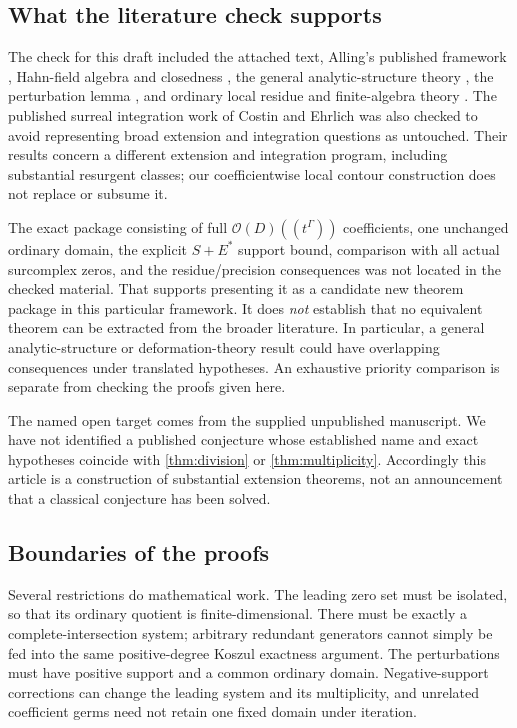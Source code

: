 \documentclass[11pt,letterpaper]{article}
\theoremstyle{definition}
\theoremstyle{remark}
\newcommand{\OO}{\mathcal O}
\numberwithin{equation}{section}
\begin{document}
\subsection{What the literature check supports}
The check for this draft included the attached text, Alling's published framework \cite{Alling}, Hahn-field algebra and closedness \cite{Neumann,Poonen}, the general analytic-structure theory \cite{CluckersLipshitz}, the perturbation lemma \cite{Crainic}, and ordinary local residue and finite-algebra theory \cite{Demailly,Kunz,CattaniDickenstein}. The published surreal integration work of Costin and Ehrlich \cite{CostinEhrlich} was also checked to avoid representing broad extension and integration questions as untouched. Their results concern a different extension and integration program, including substantial resurgent classes; our coefficientwise local contour construction does not replace or subsume it.

The exact package consisting of full $\OO(D)((t^\Gamma))$ coefficients, one unchanged ordinary domain, the explicit $S+E^*$ support bound, comparison with all actual surcomplex zeros, and the residue/precision consequences was not located in the checked material. That supports presenting it as a candidate new theorem package in this particular framework. It does \emph{not} establish that no equivalent theorem can be extracted from the broader literature. In particular, a general analytic-structure or deformation-theory result could have overlapping consequences under translated hypotheses. An exhaustive priority comparison is separate from checking the proofs given here.

The named open target comes from the supplied unpublished manuscript. We have not identified a published conjecture whose established name and exact hypotheses coincide with \cref{thm:division} or \cref{thm:multiplicity}. Accordingly this article is a construction of substantial extension theorems, not an announcement that a classical conjecture has been solved.

\subsection{Boundaries of the proofs}
Several restrictions do mathematical work. The leading zero set must be isolated, so that its ordinary quotient is finite-dimensional. There must be exactly a complete-intersection system; arbitrary redundant generators cannot simply be fed into the same positive-degree Koszul exactness argument. The perturbations must have positive support and a common ordinary domain. Negative-support corrections can change the leading system and its multiplicity, and unrelated coefficient germs need not retain one fixed domain under iteration.
\end{document}
